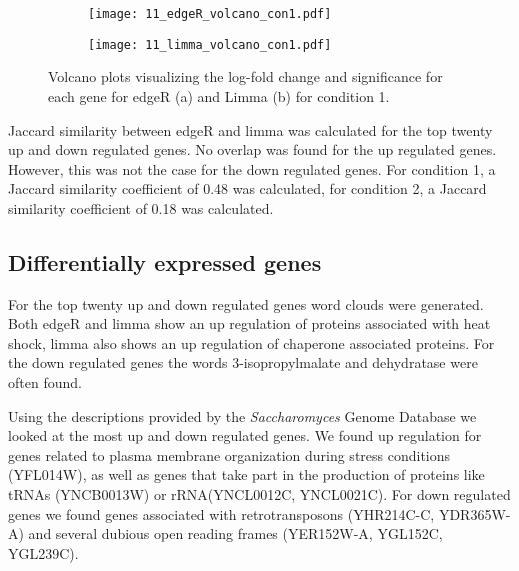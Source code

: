 \begin{figure}[H]
    \centering
    \begin{subfigure}[b]{0.45\textwidth} 
        \centering
        \texttt{[image: 11\_edgeR\_volcano\_con1.pdf]} 
        \caption{}
        \label{fig:vol_edgeR_1}
    \end{subfigure}
    \hfill %
    \begin{subfigure}[b]{0.45\textwidth} %
        \centering
        \texttt{[image: 11\_limma\_volcano\_con1.pdf]} %
        \caption{}
        \label{fig:vol_edgeR_2}
    \end{subfigure}
    \caption{Volcano plots visualizing the log-fold change 
    and significance for each gene for edgeR (a) and Limma (b) for condition 1.}
    \label{fig:vol_edgeR}
\end{figure}

Jaccard similarity between edgeR and limma was calculated for the top twenty up and down regulated genes. No overlap 
was found for the up regulated genes. However, this was not the case for the down regulated genes.
For condition 1, a Jaccard similarity coefficient of 0.48 was calculated, for condition 2, a Jaccard 
similarity coefficient of 0.18 was calculated.

\subsection{Differentially expressed genes}

For the top twenty up and down regulated genes word clouds were generated. 
Both edgeR and limma show an up regulation of proteins associated with heat shock, 
limma also shows an up regulation of chaperone associated proteins. 
For the down regulated genes the words 3-isopropylmalate and dehydratase were often found.

Using the descriptions provided by the \textit{Saccharomyces} Genome Database \cite{noauthor_saccharomyces_nodate}
we looked at the most up and down regulated genes. We found up regulation for genes related to 
plasma membrane organization during stress conditions (YFL014W), as well as genes that 
take part in the production of proteins like tRNAs (YNCB0013W) or rRNA(YNCL0012C, YNCL0021C).
For down regulated genes we found genes associated with retrotransposons (YHR214C-C, YDR365W-A) 
and several dubious open reading frames (YER152W-A, YGL152C, YGL239C).




